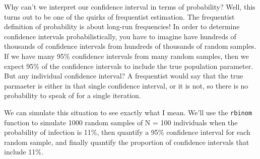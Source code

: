 \documentclass[
]{book}
\begin{document}
Why can't we interpret our confidence interval in terms of probability? Well, this turns out to be one of the quirks of frequentist estimation. The frequentist definition of probability is about long-run frequencies! In order to determine confidence intervals probabilistically, you have to imagine have hundreds of thousands of confidence intervals from hundreds of thousands of random samples. If we have many 95\% confidence intervals from many random samples, then we expect 95\% of the confidence intervals to include the true population parameter. But any individual confidence interval? A frequentist would say that the true parmaeter is either in that single confidence interval, or it is not, so there is no probability to speak of for a single iteration.

We can simulate this situation to see exactly what I mean. We'll use the \texttt{rbinom} function to simulate 1000 random samples of N = 100 individuals when the probability of infection is 11\%, then quantify a 95\% confidence interval for each random sample, and finally quantify the proportion of confidence intervals that include 11\%.
\end{document}
